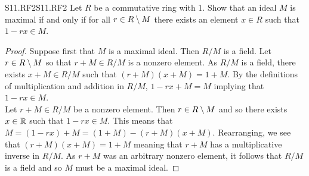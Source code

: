 \documentclass[../../AlgebraQualSolutions.tex]{subfiles}
\begin{document}
\begin{prob}{S11.RF2}{S11.RF2}
	Let $R$ be a commutative ring with 1. Show that an ideal $M$ is maximal if and only if for all $r \in R \setminus M$ there exists an element $x \in R$ such that $1 - rx \in M$.
\end{prob}

\begin{proof}
	Suppose first that $M$ is a maximal ideal. Then $R/M$ is a field. Let $r \in R \setminus M$ so that $r + M \in R/M$ is a nonzero element. As $R/M$ is a field, there exists $x + M \in R/M$ such that $(r + M)(x + M) = 1 + M$. By the definitions of multiplication and addition in $R/M$, $1 - rx + M = M$ implying that $1 - rx \in M$.\\

	Let $r + M \in R/M$ be a nonzero element. Then $r \in R \setminus M$ and so there exists $x \in \mathbb{R}$ such that $1 - rx \in M$. This means that $M = (1 - rx) + M = (1 + M) - (r + M)(x + M)$. Rearranging, we see that $(r + M)(x + M) = 1 + M$ meaning that $r + M$ has a multiplicative inverse in $R/M$. As $r + M$ was an arbitrary nonzero element, it follows that $R/M$ is a field and so $M$ must be a maximal ideal.
\end{proof}
\end{document}
